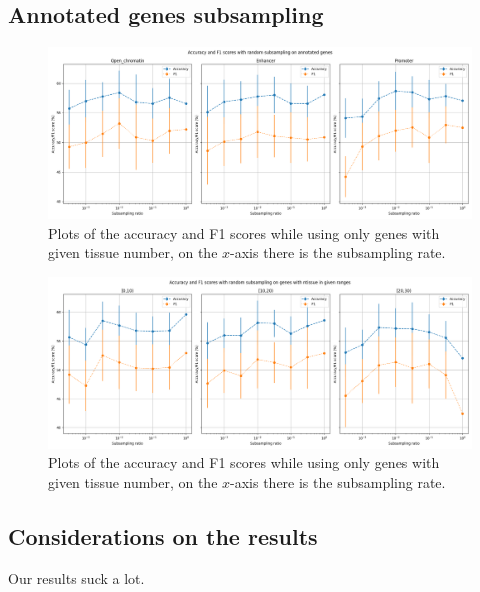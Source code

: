 \subsection{Annotated genes subsampling}
\begin{figure}[ht]
    \begin{center}
\includegraphics[width=\textwidth]{figures/subsample_annotated.png}
    \end{center}
\caption{Plots of the accuracy and F1 scores while using only genes with given tissue number, on the $x$-axis there is the subsampling rate.}
\label{fig:res3}
\end{figure}
\begin{figure}[ht]
    \begin{center}
\includegraphics[width=\textwidth]{figures/subsample_ntissue.png}
    \end{center}
\caption{Plots of the accuracy and F1 scores while using only genes with given tissue number, on the $x$-axis there is the subsampling rate.}
\label{fig:res4}
\end{figure}

\subsection{Considerations on the results}
Our results suck a lot.
